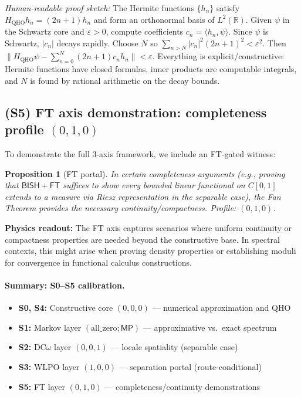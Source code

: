 \documentclass[11pt]{article}
\newcommand{\FT}{\mathsf{FT}}
\newcommand{\MP}{\mathsf{MP}}
\theoremstyle{plain}
\newtheorem{proposition}[theorem]{Proposition}
\theoremstyle{definition}
\theoremstyle{remark}
\newenvironment{hrproof}{\noindent\textit{Human-readable proof sketch:} }{}
\newcommand{\R}{\mathbb{R}}
\newcommand{\BISH}{\mathsf{BISH}}
\begin{document}
\begin{hrproof}
The Hermite functions $\{h_n\}$ satisfy $H_{\mathrm{QHO}} h_n = (2n+1)h_n$ and form an orthonormal basis of $L^2(\R)$. Given $\psi$ in the Schwartz core and $\varepsilon>0$, compute coefficients $c_n = \langle h_n, \psi\rangle$. Since $\psi$ is Schwartz, $|c_n|$ decays rapidly. Choose $N$ so $\sum_{n>N} |c_n|^2(2n+1)^2 < \varepsilon^2$. Then $\|H_{\mathrm{QHO}}\psi - \sum_{n=0}^N (2n+1) c_n h_n\| < \varepsilon$. Everything is explicit/constructive: Hermite functions have closed formulas, inner products are computable integrals, and $N$ is found by rational arithmetic on the decay bounds.
\end{hrproof}

\subsection{(S5) FT axis demonstration: completeness profile $(0,1,0)$}
To demonstrate the full 3-axis framework, we include an FT-gated witness:

\begin{proposition}[FT portal]
In certain completeness arguments (e.g., proving that $\BISH + \FT$ suffices to show every bounded linear functional on $C[0,1]$ extends to a measure via Riesz representation in the separable case), the Fan Theorem provides the necessary continuity/compactness. Profile: $(0,1,0)$.
\end{proposition}

\noindent\textbf{Physics readout:} The FT axis captures scenarios where uniform continuity or compactness properties are needed beyond the constructive base. In spectral contexts, this might arise when proving density properties or establishing moduli for convergence in functional calculus constructions.

\paragraph{Summary: S0--S5 calibration.} 
\begin{itemize}
\item \textbf{S0, S4:} Constructive core $(0,0,0)$ — numerical approximation and QHO 
\item \textbf{S1:} Markov layer $(\text{all\_zero}; \MP)$ — approximative vs.\ exact spectrum
\item \textbf{S2:} DC$\omega$ layer $(0,0,1)$ — locale spatiality (separable case) 
\item \textbf{S3:} WLPO layer $(1,0,0)$ — separation portal (route-conditional)
\item \textbf{S5:} FT layer $(0,1,0)$ — completeness/continuity demonstrations
\end{itemize}
\end{document}
